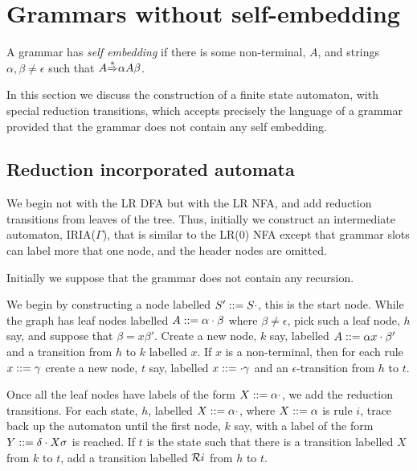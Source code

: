 \section{Grammars without self-embedding}

A grammar has {\em self embedding} if there is some non-terminal,
$A$, and strings $\alpha,\beta\not=\epsilon$ such that $A{\mathop{\Rightarrow}\limits^*}\alpha
A\beta$.

In this section we discuss the construction of a finite state
automaton, with special reduction transitions,
which accepts precisely the language of a grammar provided that the
grammar does not contain any self embedding.


\subsection{Reduction incorporated automata}

We begin not with the LR DFA but with the LR NFA, and add
reduction transitions from leaves of the tree. Thus,
initially we construct an intermediate
automaton, IRIA($\Gamma$), that is similar
to the LR(0) NFA except that grammar slots can label more that one
node, and the header nodes are omitted.

Initially we suppose that the grammar does not contain any recursion.

We begin by constructing a node labelled $S'::= S\cdot$, this is the
start node. While the graph has leaf nodes labelled
$A::=\alpha\cdot\beta$ where $\beta\not=\epsilon$, pick such a leaf
node, $h$ say, and suppose that $\beta=x\beta'$. Create a new node,
$k$ say, labelled
$A::=\alpha x\cdot \beta'$ and a transition from $h$ to $k$ labelled
$x$. If $x$ is a non-terminal, then for each rule $x::=\gamma$ create
a new node, $t$ say, labelled $x::=\cdot\gamma$ and an
$\epsilon$-transition from $h$ to $t$.
\begin{center}
{\footnotesize

}
\end{center}

Once all the leaf nodes have labels of the form $X::=\alpha\cdot$,
we add the reduction transitions.
For each state, $h$, labelled $X::=\alpha\cdot$, 
where $X::=\alpha$ is rule $i$, trace back up the automaton until the
first node, $k$ say, with a label of the form $Y::=\delta \cdot X\sigma$
is reached. If $t$ is the state such that there is a transition
labelled $X$ from $k$ to $t$, add a transition labelled ${\cal R} i$ from
$h$ to $t$. 
\begin{center}
{\footnotesize

}
\end{center}

